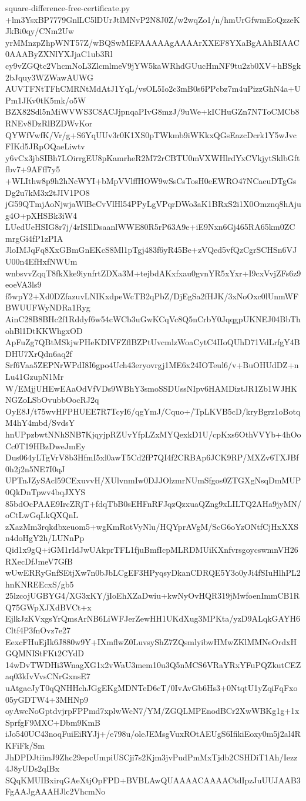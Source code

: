\documentclass[11pt]{article}
\theoremstyle{definition}
\theoremstyle{remark}
\begin{document}
\begin{filecontents*}[overwrite]{square-difference-free-certificate.py}
+lm3YsxBP7779GnlLC5lDUrJtlMNvP2N8J0Z/w2wqZo1/n/hmUrGfwmEoQzzeKJkBi0qy/CNm2Uw
yrMMnzpZhpWNT57Z/wBQSwMEFAAAAAgAAAArXXEF8YXaBgAAhBIAAC0AAAByZXNlYXJjaC1ub3Rl
cy9vZGQtc2VhcmNoL3ZlcmlmeV9jYW5kaWRhdGUucHmNF9tu2zb0XV+hBSgk2bJquy3WZWawAUWG
AUVTFNtTFhCMRNtMdAtJ1YqL/vsOL5Io2c3mB0s6PPcbz7m4uPizzGhN4a+UPm1JKv0tK5mk/o5W
BZX82Sdl5nMiWVWS3C8ACJjpnqaPIvG8mzJ/9uWe+kICHuGZn7N7ToCMCb8RNEv8DzRlBZDWvKor
QYWfVwfK/Vr/g+S6YqUUv3r0K1XS0pTWkmb9iWKkxQGsEazcDcrk1Y5wJvcFIKd5JRpOQaeLiwtv
y6vCx3jbSIBh7LOirrgEU8pKamrheR2M72rCBTU0mVXWHlrdYxCVkjytSklbGftfbv7+9AFff7y5
+WLIthw8p9h2hNcWYI+bMpVVlffHOW9wSsCsTosH0eEWRO47NCaeuDTgGsDg2u7kM3x2tJIV1PO8
jG59QTmjAoNjwjaWlBcCvVlHl54PPyLgVPqrDWo3aK1BRxS2i1X0Omznq8hAjug4O+pXHSBk3iW4
LUedUeHSIG8r7j/4rISIlDsaanlWWE80R5rP63A9e+iE9Nxn6Gj465RA65km0ZCmrgGi4fP1zPIA
JloIMJqFq8XxGBmGnEKcS8Ml1pTgj483f6yR45Be+zVQed5vfQzCgrSCHSn6VJU00n4EfHxfNWUm
wnbsvvZqqT8fkXke9iynfrtZDXa3M+tejbdAKxfxau0gvnYR5xYxr+I9cxVvjZFs6z9eoeVA3ls9
f5wpY2+Xd0DZfazuvLNIKxdpeWcTB2qPbZ/DjEgSa2fHJK/3xNoOxc0lUnmWFBWUUFWyNDRa1Ryg
AinC28B8BHc2f1Rddyf6w54cWCb3uGwKCqVc8Q5nCrbY0JqqgpUKNEJ04BbThohBl1DtKKWhgxOD
ApFuZg7QBtMSkjwPHeKDIVFZflBZPtUvcmlzWoaCytC4IIoQUhD71VdLrfgY4BDHU7XrQdn6aq2f
Srf6Vaa5ZEPNrWPdI8I6gpo4Uch43eryovrgj1ME6x24IOTeul6/v+BuOHUdDZ+nLu41GzupN1Mr
W/EMjjUHEwEAaOdVfVDs9WBhY3smoSSDUssNIpv6HAMDiztJR1Zb1WJHKNGZoLSbOvubbOocRJ2q
OyE8J/t75wvHFPHUEE7R7TcyI6/qgYmJ/Cquo+/TpLKVB5cD/kryBgrz1oBotqM4hY4mbd/SvdsY
hnUPpzbwtNNhSNB7KjqyjpRZUvYfpLZxMYQexkD1U/cpKxs6OthVVYb+4hOoCc0T19HBzDweJmEy
Dus064yLTgVrV8b3HfmI5xl0awT5Cd2fP7QI4f2CRBAp6JCK9RP/MXZv6TXJBf0h2j2n5NE7I0qJ
UPTnJZySAcl59CExuvvH/XUlvnmIw0DJJOlzmrNUmSfgos0ZTGXgNsqDmMUP0QkDnTpwv4bqJXYS
85bdOcPAAE9IrcZRjT+fdqTbB0sEHFnRFJqzQzxuaQZng9xLILTQ2AHa9jyMN/oCtLwGqLkQXQnL
zXazMm3rqkdbxeuom5+wgKmRotVyNlu/HQYprAVgM/ScG6oYzONtfCjHxXXSn4doHgY2h/LUNnPp
Qid1x9gQ+iGM1rIdJwUAkprTFL1fjuBmfIcpMLRDMUiKXnfvrsgoycswmnVH26RXecDfJmeV7GfB
wUwERRyGnfSEtjXw7n0bJbLCgEF3HPyqsyDkanCDRQE5Y3o0yJi4fSIuHlhPL2hnKNREEcxS/gb5
25lzcojUGBYG4/XG3xKY/jIoEhXZaDwiu+kwNyOvHQR319jMwfoenImmCB1RQ75GWpXJXdBVCt+x
EjlkJzKVxgsYrQmsArNB6LiWFJerZewHH1UKdXug3MPKta/yzD9ALqkGAYH6Cltf4P3fnOvz7e27
EexcFHuEjIk6J880w9Y+IXmflwZ0LuvsyShZ7ZQsmlyibwHMwZKlMMNeOrdxHGQMNIStFKt2CYdD
14wDvTWDHi3WnagXG1x2vWaU3mem10u3Q5nMCS6VRaYRxYFuPQZkutCEZaq03kIvVvsCNrGxnsE7
uAtgacJyT0qQNHHchJGgEKgMDNTeD6cT/0IvAvGb6Hs3+0NtqtU1yZqiFqFxo05yGDTW4+3MHNp9
oyAwcNoGptdvjrpFPPmd7xplwWcN7/YM/ZGQLMPEnodBCr2XwWBKg1g+1xSprfgF9MXC+Dbm9KmB
iJo540UC43noqFuiEiRYJj+/e798u/oleJEMsgVuxROtAEUgS6IfikiEoxy0m5j2al4RKFiFk/Sm
JhDPDJtiimJ9Zhc29epcUmpiUSCji7s2Kjm3jvPudPmMxTjdb2CSHDiT1Ah/Iezz4J8yUDs2qIBx
SQqKMUIBxirqGAeXtjOpFPD+BVBLAwQUAAAACAAAACtdIpzJuUUJAAB3FgAAJgAAAHJlc2VhcmNo

\end{filecontents*}
\end{document}
